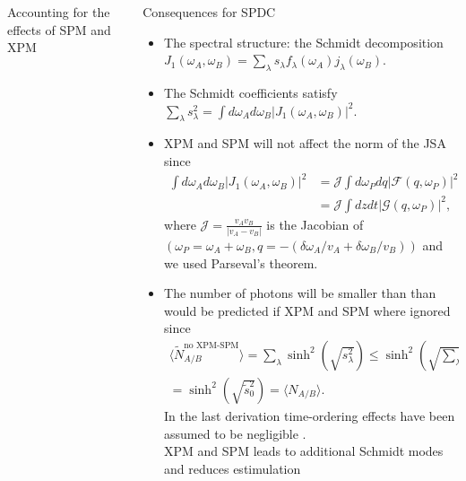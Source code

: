 \documentclass[final]{beamer} %
\newcommand{\braket}[1]{\langle #1 \rangle}
\begin{document}
\begin{frame}[t]
\begin{columns}[t]
\begin{column}{0.34\paperwidth}
\begin{alertblock}{Accounting for the effects of SPM and XPM}
\end{alertblock}

\end{column}


  \begin{column}{0.30\paperwidth} 
\begin{alertblock}{Consequences for SPDC}
\begin{itemize}
\item The spectral structure: the Schmidt decomposition \\
 $J_1(\omega_A,\omega_B)=\sum_\lambda s_\lambda f_\lambda (\omega_A) j_\lambda(\omega_B)$. 
\item The Schmidt coefficients satisfy $\sum_\lambda s_\lambda^2=\int d \omega_A d\omega_B |J_1(\omega_A,\omega_B)|^2$.
\item XPM and SPM will not affect the norm of the JSA since
\begin{align*}
\int d \omega_A d\omega_B |J_1(\omega_A,\omega_B)|^2&= \mathcal{J} \int d \omega_P dq |\mathcal{F}(q,\omega_P)|^2 \\
&= \mathcal{J}  \int dz dt|\mathcal{G}(q,\omega_P)|^2,
\end{align*}
where $\mathcal{J}=\frac{v_A v_B}{|v_A-v_B|}$ is the Jacobian of  $(\omega_P=\omega_A+\omega_B,q=-(\delta \omega_A/v_A+\delta \omega_B/v_B))$ and we used Parseval's theorem.
\item The number of photons will be smaller than than would be predicted if XPM and SPM where ignored since
\begin{align*}
\braket{ \tilde N^{\text{no XPM-SPM}}_{A/B}}=\sum_{\lambda} \sinh^2\left( \sqrt{s_\lambda^2} \right) \leq  \sinh^2 \left( \sqrt{ \sum_{\lambda} s_\lambda^2}\right) \\
=\sinh^2 \left( \sqrt{ \tilde s_0^2}\right)=\braket{N_{A/B}}.
\end{align*}
In the last derivation time-ordering effects have been assumed to be negligible \cite{nico1}.\\
\textcolor{brownish}{XPM and SPM leads to additional Schmidt modes and reduces estimulation}
\end{itemize}

\end{alertblock}


\end{column}
\end{columns}
\end{frame}
\end{document}
